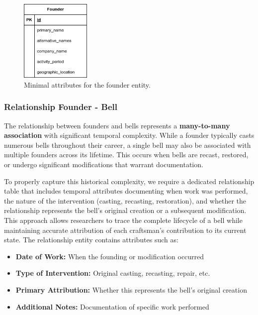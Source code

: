 \documentclass[11pt, a4paper]{article}
\begin{document}
\begin{figure}[h!]
    \centering
    \includegraphics[width=0.3\textwidth]{images/founder.png}
    \caption{Minimal attributes for the founder entity.}
    \label{fig:founder-entity}
\end{figure}

\subsubsection{Relationship Founder - Bell}

The relationship between founders and bells represents a \textbf{many-to-many association} with significant temporal complexity. While a founder typically casts numerous bells throughout their career, a single bell may also be associated with multiple founders across its lifetime. This occurs when bells are recast, restored, or undergo significant modifications that warrant documentation. 

To properly capture this historical complexity, we require a dedicated relationship table that includes temporal attributes documenting when work was performed, the nature of the intervention (casting, recasting, restoration), and whether the relationship represents the bell's original creation or a subsequent modification. This approach allows researchers to trace the complete lifecycle of a bell while maintaining accurate attribution of each craftsman's contribution to its current state. The relationship entity contains attributes such as:

\begin{itemize}
    \item \textbf{Date of Work:} When the founding or modification occurred
    \item \textbf{Type of Intervention:} Original casting, recasting, repair, etc.
    \item \textbf{Primary Attribution:} Whether this represents the bell's original creation
    \item \textbf{Additional Notes:} Documentation of specific work performed
\end{itemize}
\end{document}
